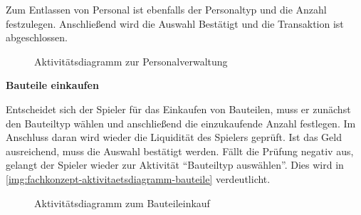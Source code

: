 Zum Entlassen von Personal ist ebenfalls der Personaltyp und die Anzahl festzulegen. Anschließend wird die Auswahl Bestätigt und die Transaktion ist abgeschlossen. 

\begin{figure}[htb]
  \centering
  \caption{Aktivitätsdiagramm zur Personalverwaltung}
  \label{img:fachkonzept-aktivitaetsdiagramm-personal}
\end{figure}

\medskip

\textbf{Bauteile einkaufen}

Entscheidet sich der Spieler für das Einkaufen von Bauteilen, muss er zunächst den Bauteiltyp wählen und anschließend die einzukaufende Anzahl festlegen. Im Anschluss daran wird wieder die Liquidität des Spielers geprüft. Ist das Geld ausreichend, muss die Auswahl bestätigt werden. Fällt die Prüfung negativ aus, gelangt der Spieler wieder zur Aktivität “Bauteiltyp auswählen”. Dies wird in \vref{img:fachkonzept-aktivitaetsdiagramm-bauteile} verdeutlicht.

\begin{figure}[htb]
  \centering
  \caption{Aktivitätsdiagramm zum Bauteileinkauf}
  \label{img:fachkonzept-aktivitaetsdiagramm-bauteile}
\end{figure}

